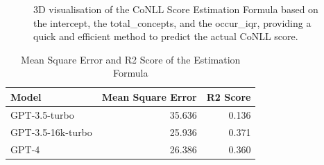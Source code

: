 \begin{figure}[htpb]
  \centering
  \quad 
  \caption[CoNLL Score Estimation]{3D visualisation of the CoNLL Score Estimation Formula based on the intercept, the total\_concepts, and the occur\_iqr, providing a quick and efficient method to predict the actual CoNLL score.}\label{fig:esimated-conll}
\end{figure}


\begin{table}[htpb]
    \centering
    \begin{tabular}{lrr}
        \hline
        Model & Mean Square Error & R2 Score \\
        \hline
        GPT-3.5-turbo & 35.636 & 0.136 \\
        GPT-3.5-16k-turbo & 25.936 & 0.371 \\
        GPT-4 & 26.386 & 0.360 \\
        \hline
    \end{tabular}
    \caption{Mean Square Error and R2 Score of the Estimation Formula}
    \label{tab:mse-r2}
\end{table}

